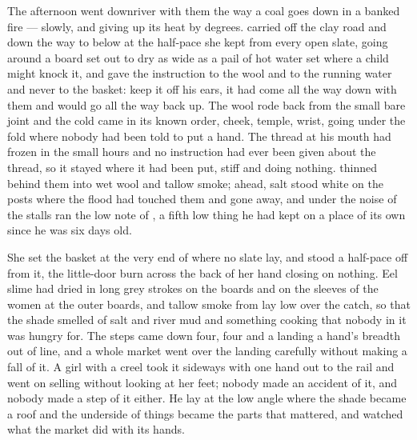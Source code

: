 The afternoon went downriver with them the way a coal goes down in a banked fire --- slowly, and giving up its heat by degrees.  carried  off the clay road and down the way to  below  at the half-pace she kept from every open slate, going around a board set out to dry as wide as a pail of hot water set where a child might knock it, and gave the instruction to the wool and to the running water and never to the basket: keep it off his ears, it had come all the way down with them and would go all the way back up. The wool rode back from the small bare joint and the cold came in its known order, cheek, temple, wrist, going under the fold where nobody had been told to put a hand. The thread at his mouth had frozen in the small hours and no instruction had ever been given about the thread, so it stayed where it had been put, stiff and doing nothing.  thinned behind them into wet wool and tallow smoke; ahead, salt stood white on the posts where the flood had touched them and gone away, and under the noise of the stalls ran the low note of , a fifth low thing he had kept on a place of its own since he was six days old.

She set the basket at the very end of  where no slate lay, and stood a half-pace off from it, the little-door burn across the back of her hand closing on nothing. Eel slime had dried in long grey strokes on the boards and on the sleeves of the women at the outer boards, and tallow smoke from  lay low over the catch, so that the shade smelled of salt and river mud and something cooking that nobody in it was hungry for. The steps came down four, four and a landing a hand's breadth out of line, and a whole market went over the landing carefully without making a fall of it. A girl with a creel took it sideways with one hand out to the rail and went on selling without looking at her feet; nobody made an accident of it, and nobody made a step of it either. He lay at the low angle where the shade became a roof and the underside of things became the parts that mattered, and watched what the market did with its hands.

